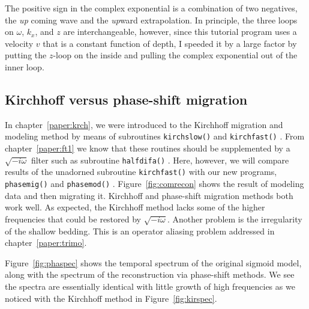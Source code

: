 \par
The positive sign in the complex exponential is a combination of two negatives,
the {\em  up}
coming wave and the {\em  up}ward extrapolation.
In principle,
the three loops on  $\omega$, $k_x$, and  $z$  are interchangeable,
however, since this tutorial program uses
a velocity $v$ that is a constant function of depth,
I speeded it by a large factor by putting the $z$-loop on the inside
and pulling the complex exponential out of the inner loop.

\subsection{Kirchhoff versus phase-shift migration}
In chapter~\ref{paper:krch}, we were introduced to the Kirchhoff
migration and modeling method by means of subroutines
\texttt{kirchslow()}  and \texttt{kirchfast()} .
From chapter~\ref{paper:ft1} we know that these routines should be
supplemented by a $\sqrt{-i\omega}$
filter such as subroutine \texttt{halfdifa()} .
Here, however,
we will compare results of the unadorned subroutine \texttt{kirchfast()} 
with our new programs, \texttt{phasemig()}  and \texttt{phasemod()} .
Figure~\ref{fig:comrecon} shows the result of modeling data and then migrating it.
Kirchhoff and phase-shift migration methods both work well.
As expected, the Kirchhoff method lacks some of the higher frequencies
that could be restored by $\sqrt{-i\omega}$.
Another problem is the irregularity of the shallow bedding.
This is an operator aliasing problem
addressed in chapter~\ref{paper:trimo}.


Figure~\ref{fig:phaspec} shows the temporal spectrum of the original sigmoid model,
along with the spectrum of the reconstruction via phase-shift methods.
We see the spectra are essentially identical
with little growth of high frequencies
as we noticed with the Kirchhoff method
in Figure~\ref{fig:kirspec}.

